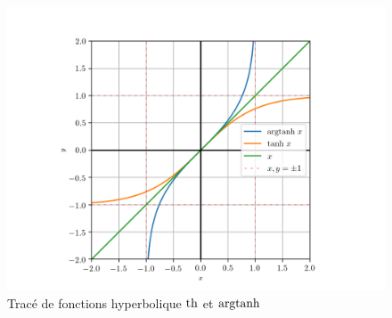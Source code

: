 %
\begin{figure}
  \centering
  \includegraphics[scale=0.6]{argtanh.png}
  \caption{Tracé de fonctions hyperbolique $\operatorname{th}$ et $\operatorname{argtanh}$}
  \label{fig:tracetanhargth}
\end{figure}
